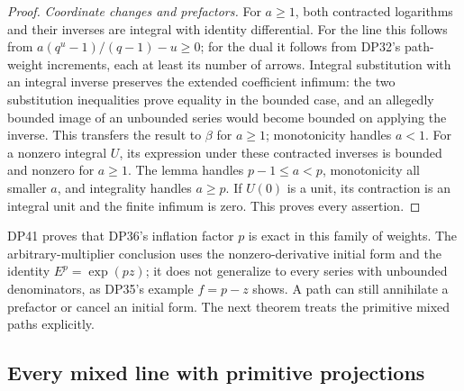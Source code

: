 \documentclass[11pt,a4paper]{article}
\theoremstyle{definition}\newtheorem{remark}[theorem]{Remark}
\begin{document}
\begin{proof}
\emph{Coordinate changes and prefactors.}
For $a\ge1$, both contracted logarithms and their inverses are integral with identity differential. For the line this follows from
$a(q^u-1)/(q-1)-u\ge0$; for the dual it follows from DP32's path-weight increments, each at least its number of arrows. Integral substitution with an integral inverse preserves the extended coefficient infimum: the two substitution inequalities prove equality in the bounded case, and an allegedly bounded image of an unbounded series would become bounded on applying the inverse.
This transfers the result to $\beta$ for $a\ge1$; monotonicity handles $a<1$.
For a nonzero integral $U$, its expression under these contracted inverses is bounded and nonzero for $a\ge1$. The lemma handles $p-1\le a<p$, monotonicity all smaller $a$, and integrality handles $a\ge p$. If $U(0)$ is a unit, its contraction is an integral unit and the finite infimum is zero. This proves every assertion.
\end{proof}

DP41 proves that DP36's inflation factor $p$ is exact in this family of weights. The arbitrary-multiplier conclusion uses the nonzero-derivative initial form and the identity $E^p=\exp(pz)$; it does not generalize to every series with unbounded denominators, as DP35's example $f=p-z$ shows. A path can still annihilate a prefactor or cancel an initial form. The next theorem treats the primitive mixed paths explicitly.


\subsection{Every mixed line with primitive projections}
\end{document}

